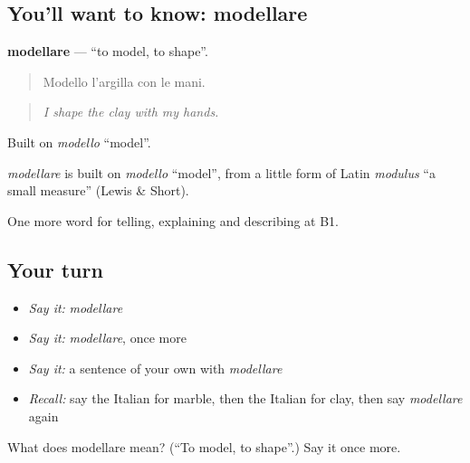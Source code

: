 \subsection*{You'll want to know: modellare}
\textbf{modellare} — \textquotedblleft{}to model, to shape\textquotedblright{}.

\begin{quote}
Modello l'argilla con le mani.
\end{quote}

\begin{quote}
\emph{I shape the clay with my hands.}
\end{quote}

Built on \emph{modello} \textquotedblleft{}model\textquotedblright{}.

\begin{cousinweb}
\emph{modellare} is built on \emph{modello} \textquotedblleft{}model\textquotedblright{}, from a little form of Latin \emph{modulus} \textquotedblleft{}a small measure\textquotedblright{} (Lewis \& Short).
\end{cousinweb}

\begin{grammarlens}[title={What you've built}]
One more word for telling, explaining and describing at B1.
\end{grammarlens}

\subsection*{Your turn}
\begin{itemize}
\raggedright
  \item \emph{Say it:} \emph{modellare}
  \item \emph{Say it:} \emph{modellare}, once more
  \item \emph{Say it:} a sentence of your own with \emph{modellare}
  \item \emph{Recall:} say the Italian for marble, then the Italian for clay, then say \emph{modellare} again
\end{itemize}

\begin{tcolorbox}[breakable,colback=teal!4,colframe=teal!35!black,title={Before you move on}]
What does modellare mean? (\textquotedblleft{}To model, to shape\textquotedblright{}.) Say it once more.
\end{tcolorbox}
